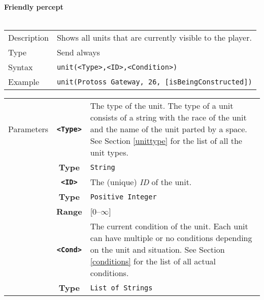 \newpage
\noindent
\textbf{Friendly percept}\\
\\
\begin{tabularx}{\textwidth}{lX}
 Description & Shows all units that are currently visible to the player. \\
 Type & Send always \\
 Syntax & \verb|unit(<Type>,<ID>,<Condition>)| \\
 Example & \verb|unit(Protoss Gateway, 26, [isBeingConstructed])| \\ 
 \end{tabularx}
 \begin{tabularx}{\textwidth}{l | c | p{8cm}|}
 \cline{2-3} 
 Parameters 
            & \textbf{\verb|<Type>|} & The type of the unit. The type of a unit consists of a string with the race of the unit and the name of the unit parted by a space. See Section \ref{unittype} for the list of all the unit types. \\
            & \textbf{Type} & \verb|String| \\
            \cline{2-3} 
            & \textbf{\verb|<ID>|} & The (unique) \textit{ID} of the unit.\\
            & \textbf{Type} & \verb|Positive Integer| \\
            & \textbf{Range} & [0--$\infty$] \\
            \cline{2-3} 
            & \textbf{\verb|<Cond>|} & The current condition of the unit. Each unit can have multiple or no conditions depending on the unit and situation. See Section \ref{conditions} for the list of all actual conditions.\\ 
            & \textbf{Type} & \verb|List of Strings| \\
            \cline{2-3} 
\end{tabularx}\\
\newpage
\noindent

